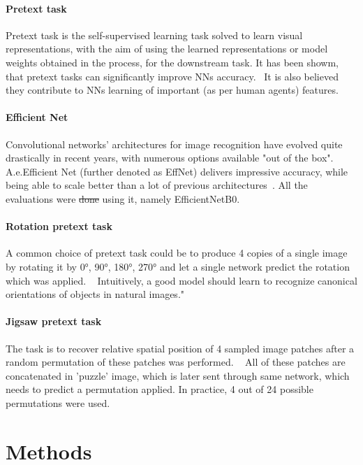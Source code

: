 \paragraph{Pretext task}
Pretext task is the self-supervised learning task solved to learn visual representations,
with the aim of using the learned representations or model weights obtained in the process, for the downstream task.
It has been showm, that pretext tasks can significantly improve NNs accuracy.~\cite{kolesnikov2019revisiting}
It is also believed they contribute to NNs learning of important (as per human agents) features.

\paragraph{Efficient Net}
Convolutional networks' architectures for image recognition have evolved quite drastically in recent years, with numerous options available "out of the box".
A.e.Efficient Net (further denoted as EffNet) delivers impressive accuracy, while being able to scale better than a lot of previous architectures~\cite{DBLP:journals/corr/abs-1905-11946}.
All the evaluations were \st{done} using it, namely EfficientNetB0.

\paragraph{Rotation pretext task}
A common choice of pretext task could be to produce 4 copies of
a single image by rotating it by {0°, 90°, 180°, 270°} and let a single network predict the rotation which was applied.
~\cite{kolesnikov2019revisiting}
Intuitively, a good model should learn to recognize canonical orientations of objects in natural images."

\paragraph{Jigsaw pretext task}
The task is to recover relative spatial position of 4 sampled image patches after a random permutation of these patches was performed.
~\cite{kolesnikov2019revisiting}
All of these patches are concatenated in 'puzzle' image, which is later sent through same network, which needs to predict a permutation applied.
In practice, 4 out of 24 possible permutations were used.




\section{Methods}


